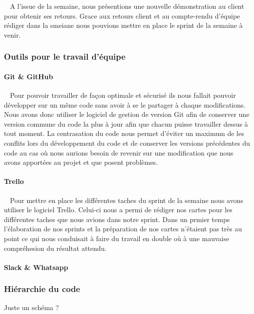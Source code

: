 \documentclass[12pt]{article}
\def\tab{$\>\>\>\>$}
\begin{document}
\tab A l'issue de la semaine, nous présentions une nouvelle démonstration au client pour obtenir ses retours. Grace aux retours client et au compte-rendu d'équipe rédiger dans la smeiane nous pouvions mettre en place le sprint de la semaine à venir.

\subsubsection{Outils pour le travail d'équipe}
\paragraph{Git \& GitHub\\}
\tab Pour pouvoir travailler de façon optimale et sécurisé ils nous fallait pouvoir développer sur un même code sans avoir à se le partager à chaque modifications. Nous avons donc utiliser le logiciel de gestion de version Git afin de conserver une version commune du code la plus à jour afin que chacun puisse travailler dessus à tout moment. La centrasation du code nous permet d'éviter un maximum de les conflits lors du développement du code et de conserver les versions précédentes du code au cas où nous aurions besoin de revenir sur une modification que nous avons apportées au projet et que posent problèmes.

\paragraph{Trello\\}
\tab Pour mettre en place les différentes taches du sprint de la semaine nous avons utiliser le logiciel Trello. Celui-ci nous a permi de rédiger nos cartes pour les différentes taches que nous avions dans notre sprint. Dans un prmier temps l'élaboration de nos sprints et la préparation de nos cartes n'étaient pas très au point ce qui nous conduisait à faire du travail en double où à une mauvaise compréhesion du résultat attendu.
\paragraph{Slack \& Whatsapp\\}
\subsubsection{Hiérarchie du code}

\begin{center}
Juste un schéma ?
\end{center}
\end{document}
